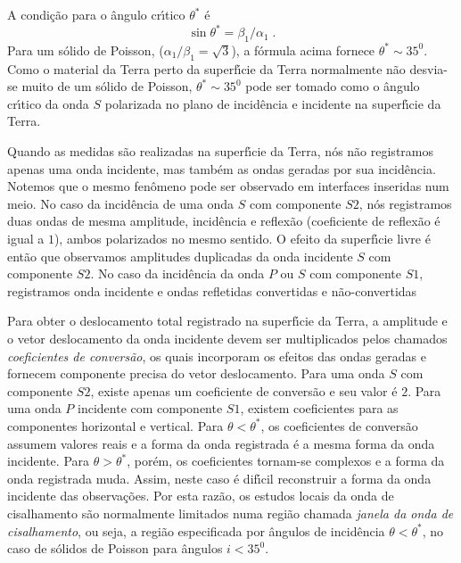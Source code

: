 A condi\c{c}\~ao para o \^angulo cr\'{\i}tico $\theta^*$ \'e
\begin{equation}
\sin{\theta^*}=\beta_1/\alpha_1 \;.
\end{equation}
Para um s\'olido de Poisson, ($\alpha_1/\beta_1=\sqrt{3}$), a
f\'ormula acima fornece $\theta^* \sim 35^0$. Como o material da
Terra perto da superf\'{\i}cie da Terra normalmente n\~ao
desvia-se muito de um s\'olido de Poisson, $\theta^* \sim 35^0$
pode ser tomado como o \^angulo cr\'{\i}tico da onda $S$
polarizada no plano de incid\^encia e incidente na superf\'{\i}cie
da Terra.

Quando as medidas s\~ao realizadas na superf\'{\i}cie da Terra,
n\'os n\~ao registramos apenas uma onda incidente, mas tamb\'em as
ondas geradas por sua incid\^encia. Notemos que o mesmo fen\^omeno
pode ser observado em interfaces inseridas num meio. No caso da
incid\^encia de uma onda $S$ com componente $S2$, n\'os
registramos duas ondas de mesma amplitude, incid\^encia e
reflex\~ao (coeficiente de reflex\~ao \'e igual a $1$), ambos
polarizados no mesmo sentido. O efeito da superf\'{\i}cie livre
\'e ent\~ao que observamos amplitudes duplicadas da onda incidente
$S$ com componente $S2$. No caso da incid\^encia da onda $P$ ou
$S$ com componente $S1$, registramos onda incidente e ondas
refletidas convertidas e n\~ao-convertidas

Para obter o deslocamento total registrado na superf\'{\i}cie da
Terra, a amplitude e o vetor deslocamento da onda incidente devem
ser multiplicados pelos chamados {\it coeficientes de
convers\~ao}, os quais incorporam os efeitos das ondas geradas e
fornecem componente precisa do vetor deslocamento. Para uma onda
$S$ com componente $S2$, existe apenas um coeficiente de
convers\~ao e seu valor \'e $2$. Para uma onda $P$ incidente com
componente $S1$, existem coeficientes para as componentes
horizontal e vertical. Para $\theta<\theta^*$, os coeficientes de
convers\~ao assumem valores reais e a forma da onda registrada \'e
a mesma forma da onda incidente. Para $\theta>\theta^*$, por\'em,
os coeficientes tornam-se complexos e a forma da onda registrada
muda. Assim, neste caso \'e dif\'{\i}cil reconstruir a forma da
onda incidente das observa\c{c}\~oes. Por esta raz\~ao, os estudos
locais da onda de cisalhamento s\~ao normalmente limitados numa
regi\~ao chamada {\it janela da onda de cisalhamento}, ou seja, a
regi\~ao especificada por \^angulos de incid\^encia
$\theta<\theta^*$, no caso de s\'olidos de Poisson para \^angulos
$i<35^{0}$.
